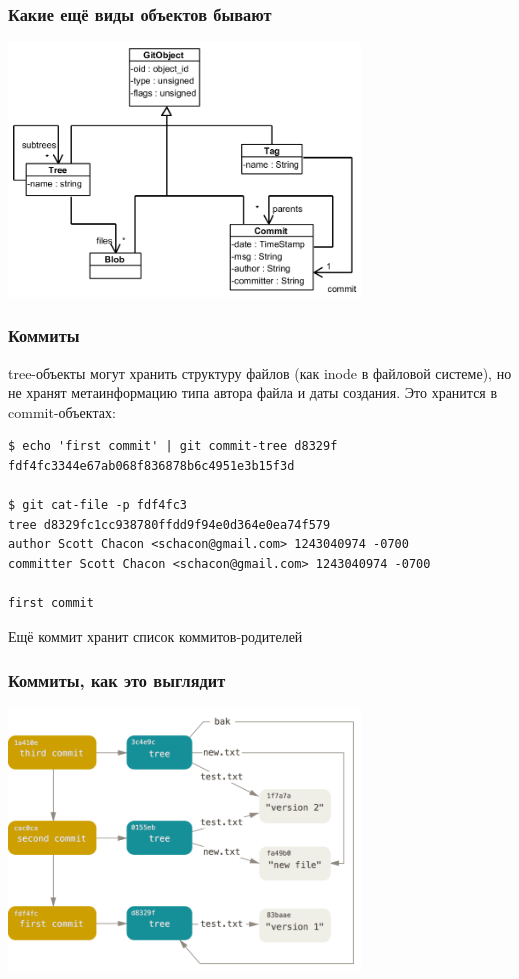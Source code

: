 \documentclass{../text-style}
\begin{document}
    \begin{frame}
        \frametitle{Какие ещё виды объектов бывают}
        \begin{center}
            \includegraphics[width=0.7\textwidth]{gitDataStructure.png}
        \end{center}
    \end{frame}

    \begin{frame}[fragile]
        \frametitle{Коммиты}
        tree-объекты могут хранить структуру файлов (как inode в файловой системе), но не хранят метаинформацию типа автора файла и даты создания. Это хранится в commit-объектах:
        \begin{verbatim}
$ echo 'first commit' | git commit-tree d8329f
fdf4fc3344e67ab068f836878b6c4951e3b15f3d

$ git cat-file -p fdf4fc3
tree d8329fc1cc938780ffdd9f94e0d364e0ea74f579
author Scott Chacon <schacon@gmail.com> 1243040974 -0700
committer Scott Chacon <schacon@gmail.com> 1243040974 -0700

first commit
        \end{verbatim}
        Ещё коммит хранит список коммитов-родителей
    \end{frame}

    \begin{frame}
        \frametitle{Коммиты, как это выглядит}
        \begin{center}
            \includegraphics[width=0.7\textwidth]{gitCommitObjects.png}
        \end{center}
    \end{frame}
\end{document}
